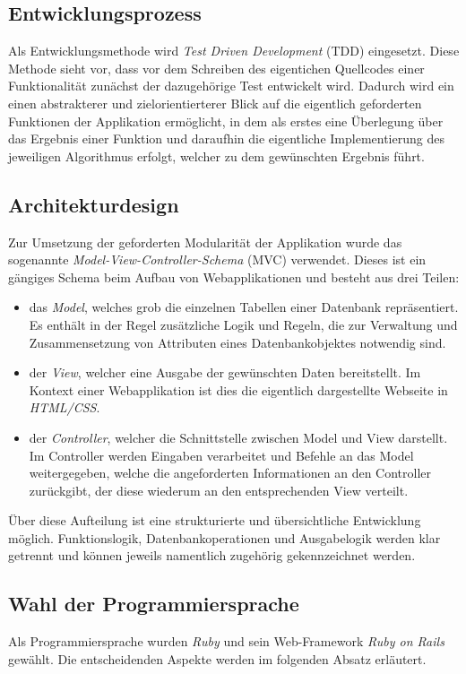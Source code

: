 \subsection{Entwicklungsprozess}
\label{sec:Entwicklungsprozess}
Als Entwicklungsmethode wird \textit{Test Driven Development} (\acs{TDD}) eingesetzt. Diese Methode
sieht vor, dass vor dem Schreiben des eigentichen Quellcodes einer Funktionalität zunächst der
dazugehörige Test entwickelt wird. Dadurch wird ein einen abstrakterer und
zielorientierterer Blick auf die eigentlich geforderten Funktionen der Applikation ermöglicht, in
dem als erstes eine Überlegung über das Ergebnis einer Funktion und daraufhin die eigentliche Implementierung
des jeweiligen Algorithmus erfolgt, welcher zu dem gewünschten Ergebnis führt.

\subsection{Architekturdesign}
\label{sec:Architekturdesign}
Zur Umsetzung der geforderten Modularität der Applikation wurde das sogenannte
\textit{Model-View-Controller-Schema} (\acs{MVC}) verwendet. Dieses ist ein gängiges Schema beim Aufbau von
Webapplikationen und besteht aus drei Teilen:
\begin{itemize}
	\item das \textit{Model}, welches grob die einzelnen Tabellen einer Datenbank repräsentiert. Es enthält in
	der Regel zusätzliche Logik und Regeln, die zur Verwaltung und Zusammensetzung von Attributen
	eines Datenbankobjektes notwendig sind.
	\item der \textit{View}, welcher eine Ausgabe der gewünschten Daten bereitstellt. Im Kontext einer
	Webapplikation ist dies die eigentlich dargestellte Webseite in \textit{HTML/CSS}.
	\item der \textit{Controller}, welcher die Schnittstelle zwischen Model und View darstellt.
	Im Controller werden Eingaben verarbeitet und Befehle an das Model weitergegeben, welche
	die angeforderten Informationen an den Controller zurückgibt, der diese wiederum an den
	entsprechenden View verteilt.
\end{itemize}
Über diese Aufteilung ist eine strukturierte und übersichtliche Entwicklung möglich. Funktionslogik,
Datenbankoperationen und Ausgabelogik werden klar getrennt und können jeweils namentlich zugehörig
gekennzeichnet werden.


\subsection{Wahl der Programmiersprache}
\label{sec:Wahl der Programmiersprache}
Als Programmiersprache wurden \textit{Ruby} und sein Web-Framework \textit{Ruby on Rails} gewählt.
Die entscheidenden Aspekte werden im folgenden Absatz erläutert.

